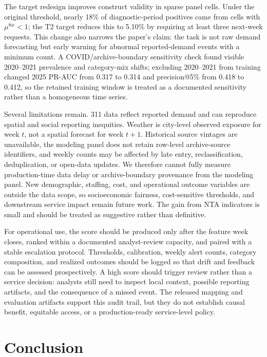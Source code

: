 \documentclass[pdflatex,sn-mathphys-num]{sn-jnl}
\begin{document}
The target redesign improves construct validity in sparse panel cells. Under the original threshold, nearly 18\% of diagnostic-period positives came from cells with \(\mu^{8w}<1\); the T2 target reduces this to 5.10\% by requiring at least three next-week requests. This change also narrows the paper's claim: the task is not raw demand forecasting but early warning for abnormal reported-demand events with a minimum count. A COVID/archive-boundary sensitivity check found visible 2020--2021 prevalence and category-mix shifts; excluding 2020--2021 from training changed 2025 PR-AUC from 0.317 to 0.314 and precision@5\% from 0.418 to 0.412, so the retained training window is treated as a documented sensitivity rather than a homogeneous time series.

Several limitations remain. 311 data reflect reported demand and can reproduce spatial and social reporting inequities. Weather is city-level observed exposure for week \(t\), not a spatial forecast for week \(t+1\). Historical source vintages are unavailable, the modeling panel does not retain row-level archive-source identifiers, and weekly counts may be affected by late entry, reclassification, deduplication, or open-data updates. We therefore cannot fully measure production-time data delay or archive-boundary provenance from the modeling panel. New demographic, staffing, cost, and operational outcome variables are outside the data scope, so socioeconomic fairness, cost-sensitive thresholds, and downstream service impact remain future work. The gain from NTA indicators is small and should be treated as suggestive rather than definitive.

For operational use, the score should be produced only after the feature week closes, ranked within a documented analyst-review capacity, and paired with a stable escalation protocol. Thresholds, calibration, weekly alert counts, category composition, and realized outcomes should be logged so that drift and feedback can be assessed prospectively. A high score should trigger review rather than a service decision: analysts still need to inspect local context, possible reporting artifacts, and the consequence of a missed event. The released mapping and evaluation artifacts support this audit trail, but they do not establish causal benefit, equitable access, or a production-ready service-level policy.

\section{Conclusion}\label{sec:conclusion}
\end{document}
